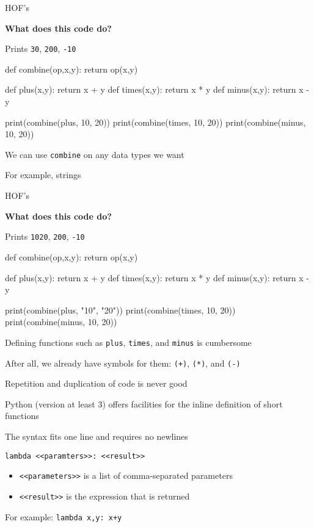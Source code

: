 \documentclass{beamer}
\begin{document}
\begin{frame}[fragile]{HOF's}
\begin{codewithblock}{\item \textbf{What does this code do?} \pause \item Prints \texttt{30}, \texttt{200}, \texttt{-10}}
def combine(op,x,y):
  return op(x,y)

def plus(x,y): return x + y
def times(x,y): return x * y
def minus(x,y): return x - y
  
print(combine(plus, 10, 20))
print(combine(times, 10, 20))
print(combine(minus, 10, 20))
\end{codewithblock}
\end{frame}

\begin{slide}{
\item We can use \texttt{combine} on any data types we want
\item For example, strings
}\end{slide}

\begin{frame}[fragile]{HOF's}
\begin{codewithblock}{\item \textbf{What does this code do?} \pause \item Prints \texttt{1020}, \texttt{200}, \texttt{-10}}
def combine(op,x,y):
  return op(x,y)

def plus(x,y): return x + y
def times(x,y): return x * y
def minus(x,y): return x - y
  
print(combine(plus, "10", "20"))
print(combine(times, 10, 20))
print(combine(minus, 10, 20))
\end{codewithblock}
\end{frame}

\begin{slide}{
\item Defining functions such as \texttt{plus}, \texttt{times}, and \texttt{minus} is cumbersome
\item After all, we already have symbols for them: \texttt{(+)}, \texttt{(*)}, and \texttt{(-)}
\item Repetition and duplication of code is never good
}\end{slide}

\begin{slide}{
\item Python (version at least 3) offers facilities for the inline definition of short functions
\item The syntax fits one line and requires no newlines
\item \texttt{lambda <<paramters>>: <<result>>}
\begin{itemize}
\item \texttt{<<parameters>>} is a list of comma-separated parameters
\item \texttt{<<result>>} is the expression that is returned
\end{itemize}
\item For example: \texttt{lambda x,y: x+y}
}\end{slide}
\end{document}
